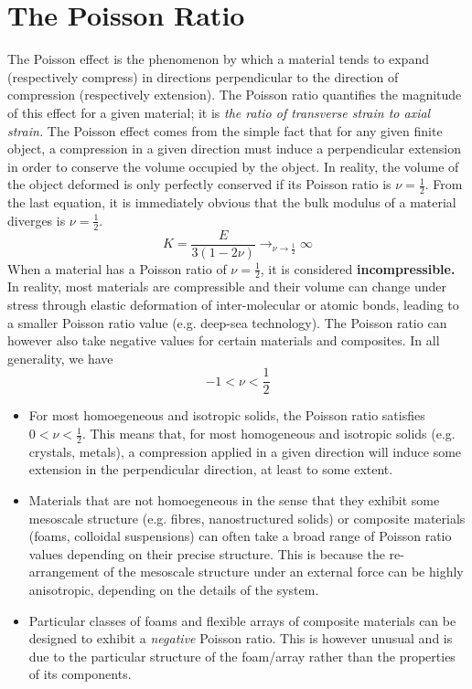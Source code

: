 \documentclass[a4paper, 11pt, normalem]{report}
\begin{document}
\section{The Poisson Ratio}
The Poisson effect is the phenomenon by which a material tends to expand (respectively compress) in directions perpendicular to the direction of compression (respectively extension).
The Poisson ratio quantifies the magnitude of this effect for a given material; it is \textit{the ratio of transverse strain to axial strain.}
The Poisson effect comes from the simple fact that for any given finite object, a compression in a given direction must induce a perpendicular extension in order to conserve the volume occupied by the object.
In reality, the volume of the object deformed is only perfectly conserved if its Poisson ratio is $\nu = \frac12$.
From the last equation, it is immediately obvious that the bulk modulus of a material diverges is $\nu = \frac12$.
\begin{equation}
    K = \frac{E}{3(1-2\nu)} \to_{\nu\to\frac12} \infty
\end{equation}
When a material has a Poisson ratio of $\nu=\frac12$, it is considered \textbf{incompressible.}
In reality, most materials are compressible and their volume can change under stress through elastic deformation of inter-molecular or atomic bonds, leading to a smaller Poisson ratio value (e.g. deep-sea technology).
The Poisson ratio can however also take negative values for certain materials and composites.
In all generality, we have
\begin{equation}
    -1 < \nu < \frac12
\end{equation}
\begin{itemize}
    \item For most homoegeneous and isotropic solids, the Poisson ratio satisfies $0 < \nu < \frac12$.
        This means that, for most homogeneous and isotropic solids (e.g. crystals, metals), a compression applied in a given direction will induce some extension in the perpendicular direction, at least to some extent.
    \item Materials that are not homoegeneous in the sense that they exhibit some mesoscale structure (e.g. fibres, nanostructured solids) or composite materials (foams, colloidal suspensions) can often take a broad range of Poisson ratio values depending on their precise structure.
        This is because the re-arrangement of the mesoscale structure under an external force can be highly anisotropic, depending on the details of the system.
    \item Particular classes of foams and flexible arrays of composite materials can be designed to exhibit a \textit{negative} Poisson ratio.
        This is however unusual and is due to the particular structure of the foam/array rather than the properties of its components.
\end{itemize}
\end{document}
